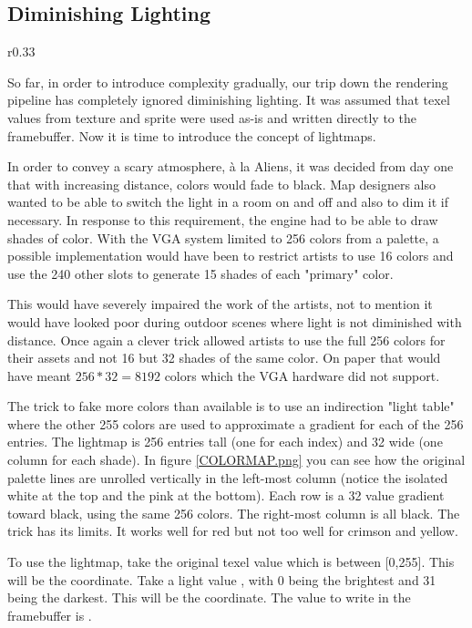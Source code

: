 \subsection{Diminishing Lighting}
\label{diminishedlightning}
\begin{wrapfigure}[11]{r}{0.33\textwidth}
\centering
{}
\end{wrapfigure}
So far, in order to introduce complexity gradually, our trip down the rendering pipeline has completely ignored diminishing lighting. It was assumed that texel values from texture and sprite were used as-is and written directly to the framebuffer. Now it is time to introduce the concept of lightmaps.\\
\par
In order to convey a scary atmosphere, \`a la Aliens, it was decided from day one that with increasing distance, colors would fade to black. Map designers also wanted to be able to switch the light in a room on and off and also to dim it if necessary. In response to this requirement, the engine had to be able to draw shades of color. With the VGA system limited to 256 colors from a palette, a possible implementation would have been to restrict artists to use 16 colors and use the 240 other slots to generate 15 shades of each "primary" color.\\
\par
This would have severely impaired the work of the artists, not to mention it would have looked poor during outdoor scenes where light is not diminished with distance. Once again a clever trick allowed artists to use the full 256 colors for their assets and not 16 but 32 shades of the same color. On paper that would have meant $256 * 32 = 8192$ colors which the VGA hardware did not support.\\
\par
 The trick to fake more colors than available is to use an indirection "light table" where the other 255 colors are used to approximate a gradient for each of the 256 entries. The lightmap is 256 entries tall (one for each index) and 32 wide (one column for each shade). In figure \ref{COLORMAP.png} you can see how the original palette lines are unrolled vertically in the left-most column (notice the isolated white at the top and the pink at the bottom). Each row is a 32 value gradient toward black, using the same 256 colors. The right-most column is all black. The trick has its limits. It works well for red but not too well for crimson and yellow.\\
 \par
 To use the lightmap, take the original texel value  which is between [0,255]. This will be the  coordinate. Take a light value , with 0 being the brightest and 31 being the darkest. This will be the  coordinate. The value to write in the framebuffer is .\\
 \par
{}





